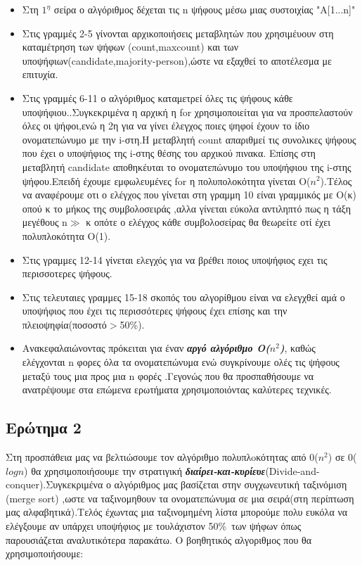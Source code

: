 \documentclass[a4paper]{article}
\begin{document}
\begin{itemize}
\item Στη $1^η$ σείρα ο αλγόριθμος δέχεται τις n ψήφους μέσω μιας συστοιχίας "A[1...n]"
\item Στις γραμμές 2-5 γίνονται αρχικοποιήσεις μεταβλητών που χρησιμέυουν στη καταμέτρηση των ψήφων (count,maxcount) και των υποψήφιων(candidate,majority-person),ώστε να εξαχθεί το αποτέλεσμα με επιτυχία.
\item Στις γραμμές 6-11 ο αλγόριθμος καταμετρεί όλες τις ψήφους κάθε υποψήφιου..Συγκεκριμένα η αρχική η for χρησιμοποιείται για να προσπελαστούν όλες οι ψήφοι,ενώ η 2η για να γίνει έλεγχος ποιες ψηφοί έχουν το ίδιο ονοματεπώνυμο με την i-στη.Η μεταβλητή  count απαριθμεί τις συνολικες ψήφους που έχει ο υποψήφιος της i-στης θέσης του αρχικού πινακα. Επίσης στη μεταβλητή candidate αποθηκέυται το ονοματεπώνυμο του υποψήφιου της i-στης ψήφου.Επειδή έχουμε εμφωλευμένες for η πολυπολοκότητα γίνεται Ο($n^2$).Τέλος να αναφέρουμε οτι ο ελέγχος που γίνεται στη γραμμη 10 είναι γραμμικός με Ο(κ) οπού κ το μήκος της συμβολοσειράς ,αλλα γίνεται εύκολα αντιληπτό πως η τάξη μεγέθους n$\gg$ κ οπότε ο ελέγχος κάθε συμβολοσείρας  θα θεωρείτε οτί έχει πολυπλοκότητα Ο(1).
\item Στις γραμμες 12-14 γίνεται  ελεγχός για να βρέθει  ποιος υποψήφιος εχει τις περισσοτερες ψήφους.
\item Στις τελευταιες γραμμες 15-18 σκοπός του αλγορίθμου είναι να ελεγχθεί αμά ο υποψήφιος που έχει τις περισσότερες ψήφους έχει επίσης και την πλειοψηφία(ποσοστό$>$50\%).
\item Aνακεφαλαιώνοντας πρόκειται για έναν\textit{\textbf{ αργό αλγόριθμο Ο($n^2$)}}, καθώς ελέγχονται n φορες όλα τα ονοματεπώνυμα ενώ συγκρίνουμε ολές τις ψήφους μεταξύ τους μια προς μια n φορές .Γεγονώς που θα προσπαθήσουμε να ανατρέψουμε στα επώμενα ερωτήματα χρησιμοποιόντας καλύτερες τεχνικές.  
\end{itemize}
\newpage

\subsection*{\color{red}Ερώτημα 2}
Στη προσπάθεια μας να βελτιώσουμε τον αλγόριθμο πολυπλoκότητας από 0($n^2$) σε 0($logn$) θα χρησιμοποιήσουμε την στρατιγική \textit{\textbf{διαίρει-και-κυρίευε}}(Divide-and-conquer).Συγκεκριμένα ο αλγόριθμος  μας βασίζεται στην συγχωνευτική ταξινόμιση (merge sort) ,ωστε να ταξινομηθουν τα ονοματεπώνυμα σε μια σειρά(στη περίπτωση μας αλφαβητικά).Τελός έχωντας μια ταξινομημένη λίστα μπορούμε πολυ ευκόλα να ελέγξουμε αν υπάρχει υποψήφιος με τουλάχιστον 50\%\ των ψήφων όπως παρουσιάζεται  αναλυτικότερα παρακάτω. Ο βοηθητικός αλγοριθμος που θα χρησιμοποιήσουμε:
         
\end{document}
